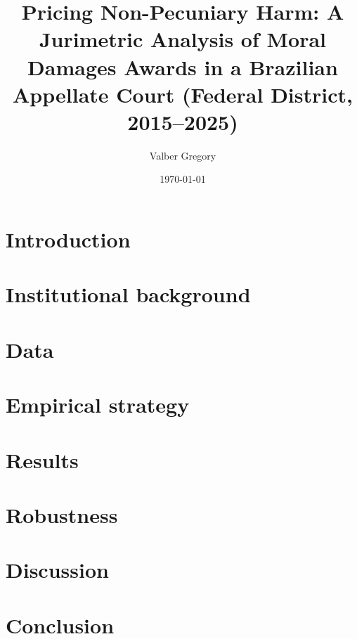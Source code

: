 \documentclass[12pt,a4paper]{article}
\title{Pricing Non-Pecuniary Harm: A Jurimetric Analysis of Moral Damages Awards in a Brazilian Appellate Court (Federal District, 2015--2025)}
\author{Valber Gregory}
\date{\today}
\begin{document}
\maketitle

\begin{abstract}
\end{abstract}

\section{Introduction}

\section{Institutional background}

\section{Data}\label{sec:data}
% 

\section{Empirical strategy}\label{sec:methods}

\section{Results}\label{sec:results}
% 

\section{Robustness}

\section{Discussion}

\section{Conclusion}






\end{document}

